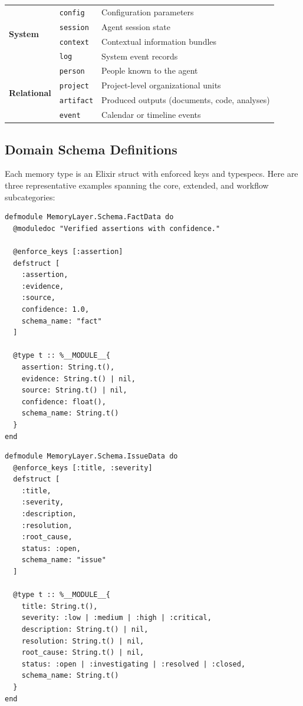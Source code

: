 \documentclass[12pt,a4paper]{article}
\theoremstyle{definition}
\begin{document}
\begin{table}[H]
\begin{tabularx}{\textwidth}{llX}
\midrule
\multirow{4}{*}{\textbf{System}} & \texttt{config} & Configuration parameters \\
  & \texttt{session} & Agent session state \\
  & \texttt{context} & Contextual information bundles \\
  & \texttt{log} & System event records \\
\midrule
\multirow{4}{*}{\textbf{Relational}} & \texttt{person} & People known to the agent \\
  & \texttt{project} & Project-level organizational units \\
  & \texttt{artifact} & Produced outputs (documents, code, analyses) \\
  & \texttt{event} & Calendar or timeline events \\
\bottomrule
\end{tabularx}
\end{table}

\subsection{Domain Schema Definitions}\label{subsec:domain-schemas}

Each memory type is an Elixir struct with enforced keys and typespecs.
Here are three representative examples spanning the core, extended, and workflow subcategories:

\begin{lstlisting}[caption={FactData: declarative knowledge with confidence tracking.}, label={lst:fact-data}]
defmodule MemoryLayer.Schema.FactData do
  @moduledoc "Verified assertions with confidence."

  @enforce_keys [:assertion]
  defstruct [
    :assertion,
    :evidence,
    :source,
    confidence: 1.0,
    schema_name: "fact"
  ]

  @type t :: %__MODULE__{
    assertion: String.t(),
    evidence: String.t() | nil,
    source: String.t() | nil,
    confidence: float(),
    schema_name: String.t()
  }
end
\end{lstlisting}

\begin{lstlisting}[caption={IssueData: problem tracking with severity and resolution.}, label={lst:issue-data}]
defmodule MemoryLayer.Schema.IssueData do
  @enforce_keys [:title, :severity]
  defstruct [
    :title,
    :severity,
    :description,
    :resolution,
    :root_cause,
    status: :open,
    schema_name: "issue"
  ]

  @type t :: %__MODULE__{
    title: String.t(),
    severity: :low | :medium | :high | :critical,
    description: String.t() | nil,
    resolution: String.t() | nil,
    root_cause: String.t() | nil,
    status: :open | :investigating | :resolved | :closed,
    schema_name: String.t()
  }
end
\end{lstlisting}
\end{document}
